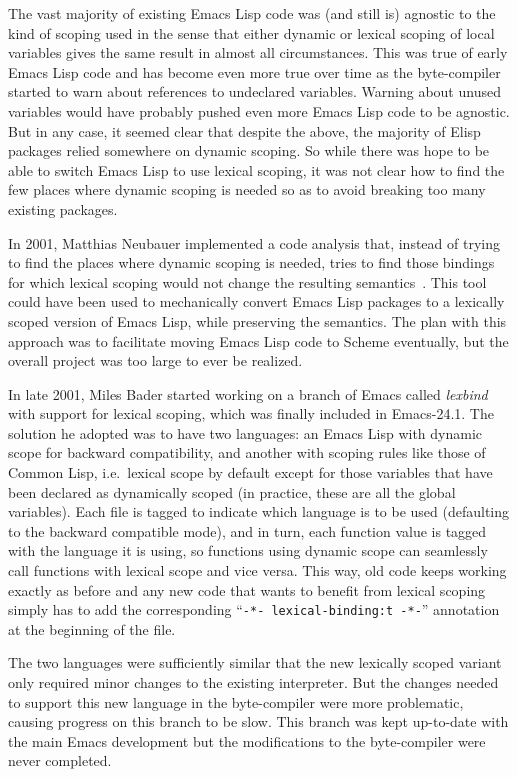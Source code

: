 \documentclass[format=acmsmall, review]{acmart}
\newcommand \Elisp {Emacs Lisp}
\begin{document}
The vast majority of existing \Elisp{} code was (and still is) agnostic to
the kind of scoping used in the sense that either dynamic or lexical scoping
of local variables gives the same result in almost all circumstances.  This was true of early
\Elisp{} code and has become even more true over time as the byte-compiler
started to warn about references to undeclared variables.  Warning about
unused variables would have probably pushed even more \Elisp{} code to be
agnostic.  But in any case, it seemed clear that despite the above, the
majority of Elisp packages relied somewhere on dynamic scoping.  So while
there was hope to be able to switch \Elisp{} to use lexical scoping, it was
not clear how to find the few places where dynamic scoping is needed so as
to avoid breaking too many existing packages.

In 2001, Matthias Neubauer implemented a code
analysis that, instead of trying to find the places where dynamic scoping is
needed, tries to find those bindings for which lexical scoping would not
change the resulting semantics~\cite{Neubauer01}.
This tool could have been used to
mechanically convert \Elisp{} packages to a lexically scoped version of
\Elisp{}, while preserving the semantics.  The plan with this approach
was to facilitate moving \Elisp{} code to Scheme eventually, but the
overall project was too large to ever be realized.

In late 2001, Miles Bader started working on a branch of Emacs called
\emph{lexbind} with support for lexical scoping, which was finally included
in Emacs-24.1.  The solution he adopted was to have two languages: an
\Elisp{} with dynamic scope for backward compatibility, and another with
scoping rules like those of Common Lisp, i.e.~lexical scope by default
except for those variables that have been declared as dynamically scoped (in
practice, these are all the global variables).  Each file is tagged to
indicate which language is to be used (defaulting to the backward compatible
mode), and in turn, each function value is tagged with the language it is
using, so functions using dynamic scope can seamlessly call functions with
lexical scope and vice versa.  This way, old code keeps working exactly
as before and any new code that wants to benefit from lexical scoping
simply has to add the corresponding ``\texttt{-*- lexical-binding:t -*-}''
annotation at the beginning of the file.

The two languages were sufficiently similar that the new lexically scoped
variant only required minor changes to the existing interpreter.  But the
changes needed to support this new language in the byte-compiler were more
problematic, causing progress on this branch to be slow.  This branch was
kept up-to-date with the main Emacs development but the modifications to the
byte-compiler were never completed.
\end{document}
